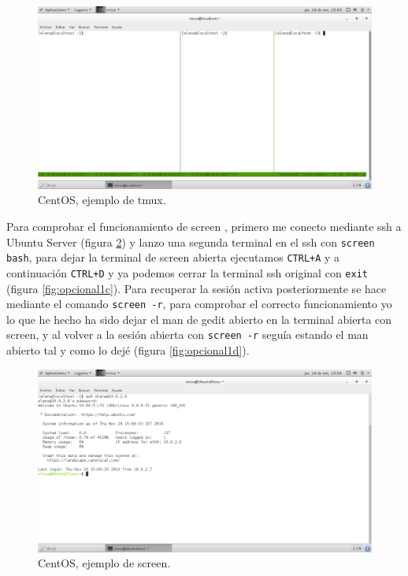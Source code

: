 \begin{figure}[H] 
	\centering
	\includegraphics[width=15cm]{./img/opcional1a.png} 	
	\caption{CentOS, ejemplo de tmux.} \label{fig:opcional1a}
\end{figure}

Para comprobar el funcionamiento de screen \cite{screen}, primero me conecto mediante ssh a Ubuntu Server (figura \ref{fig:opcional1b}) y lanzo una segunda terminal en el ssh con \texttt{screen bash}, para dejar la terminal de screen abierta ejecutamos \texttt{CTRL+A} y a continuación \texttt{CTRL+D} y ya podemos cerrar la terminal ssh original con \texttt{exit} (figura \ref{fig:opcional1c}). Para recuperar la sesión activa posteriormente se hace mediante el comando \texttt{screen -r}, para comprobar el correcto funcionamiento yo lo que he hecho ha sido dejar el man de gedit abierto en la terminal abierta con screen, y al volver a la sesión abierta con \texttt{screen -r} seguía estando el man abierto tal y como lo dejé (figura \ref{fig:opcional1d}). 

\begin{figure}[H] 
	\centering
	\includegraphics[width=15cm]{./img/opcional1b.png} 	
	\caption{CentOS, ejemplo de screen.} \label{fig:opcional1b}
\end{figure}

